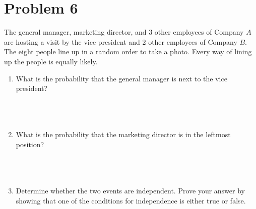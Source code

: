 \documentclass{amsart}
\theoremstyle{definition}
\theoremstyle{Exercise}
\theoremstyle{remark}
\theoremstyle{rule}
\numberwithin{equation}{section}
\begin{document}
  \section*{}
  \section*{}
  \section*{Problem 6}
The general manager, marketing director, and 3 other employees of Company $A$ are hosting a visit by the vice president and 2 other employees of Company $B$. The eight people line up in a random order to take a photo. Every way of lining up the people is equally likely.
\begin{enumerate}[label=(\alph*)]
  \item What is the probability that the general manager is next to the vice president?
\\\\
\\\\
  \item What is the probability that the marketing director is in the leftmost position?
\\\\
\\\\
  \item Determine whether the two events are independent. Prove your answer by showing that one of the conditions for independence is either true or false.
 \\\\
\\\\
\end{enumerate}
\end{document}
